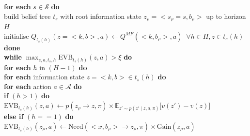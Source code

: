 \documentclass{article}
\begin{document}
\textbf{for each} $s \in \mathcal{S}$ \textbf{do} \\
\hspace*{0.5cm} build belief tree $t_s$ with root information state $z_{\rho}=<s_{\rho}=s, b_{\rho}>$ up to horizon $H$\\
\hspace*{0.5cm} initialise $Q_{t_{s}(h)}(z=<k, b>, a) \leftarrow Q^{MF}(<k, b_{\rho}>, a) \; \; \forall h \in H, z \in t_{s}(h)$\\
\textbf{done}\\
\textbf{while} $\max_{z, a, t_{s}, h} \text{EVB}_{t_{s}(h)}(z, a) > \xi$ \textbf{do}\\
\hspace*{0.5cm} \textbf{for each} $h$ in $(H-1)$ \textbf{do}\\
\hspace*{0.5cm} \hspace*{0.5cm} \textbf{for each} information state $z=<k, b> \in t_s(h)$ \textbf{do}\\
\hspace*{0.5cm} \hspace*{0.5cm} \hspace*{0.5cm} \textbf{for each} action $a\in \mathcal{A}$ \textbf{do}\\
\hspace*{0.5cm} \hspace*{0.5cm} \hspace*{0.5cm} \hspace*{0.5cm} \textbf{if} $(h > 1)$ \textbf{do}\\
\hspace*{0.5cm} \hspace*{0.5cm} \hspace*{0.5cm} \hspace*{0.5cm} \hspace*{0.5cm} $\text{EVB}_{t_{s}(h)}(z, a) \leftarrow p(z_{\rho} \rightarrow z, \pi) \times \mathbb{E}_{z' \sim p(z' \mid z, a, \pi)}\big[v(z')-v(z)\big]$\\
\hspace*{0.5cm} \hspace*{0.5cm} \hspace*{0.5cm} \hspace*{0.5cm} \textbf{else if} $(h == 1)$ \textbf{do}\\
\hspace*{0.5cm} \hspace*{0.5cm} \hspace*{0.5cm} \hspace*{0.5cm} \hspace*{0.5cm} $\text{EVB}_{t_{s}(h)}(z_{\rho}, a) \leftarrow \text{Need}(<x, b_{\rho}> \rightarrow z_{\rho}, \pi) \times \text{Gain}(z_{\rho}, a)$\\
\end{document}
